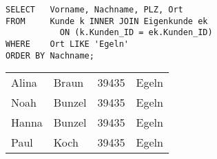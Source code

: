         \begin{lstlisting}[language=oracle_sql,caption={Join mit einschränkender WHERE-Klausel und Sortierung},label=sql04_05]
SELECT   Vorname, Nachname, PLZ, Ort
FROM     Kunde k INNER JOIN Eigenkunde ek
           ON (k.Kunden_ID = ek.Kunden_ID)
WHERE    Ort LIKE 'Egeln'
ORDER BY Nachname;
        \end{lstlisting}
        \begin{center}
          \begin{small}
            \tablehead{}
            \begin{msoraclesql}
              \begin{supertabular}{llll}
                Alina & Braun & 39435 & Egeln \\
                Noah & Bunzel & 39435 & Egeln \\
                Hanna & Bunzel & 39435 & Egeln \\
                Paul & Koch & 39435 & Egeln \\
                \end{supertabular}
            \end{msoraclesql}
          \end{small}
        \end{center}
